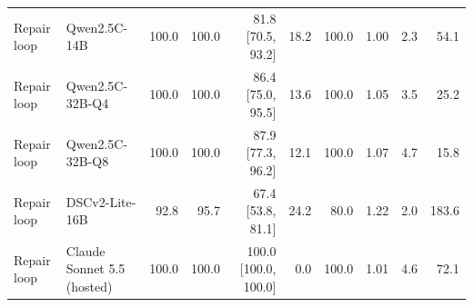 \begin{table}[t]
\begin{tabular}{llrrrrrrrr}
Repair loop & Qwen2.5C-14B & 100.0 & 100.0 & 81.8 [70.5, 93.2] & 18.2 & 100.0 & 1.00 & 2.3 & 54.1 \\
Repair loop & Qwen2.5C-32B-Q4 & 100.0 & 100.0 & 86.4 [75.0, 95.5] & 13.6 & 100.0 & 1.05 & 3.5 & 25.2 \\
Repair loop & Qwen2.5C-32B-Q8 & 100.0 & 100.0 & 87.9 [77.3, 96.2] & 12.1 & 100.0 & 1.07 & 4.7 & 15.8 \\
Repair loop & DSCv2-Lite-16B & 92.8 & 95.7 & 67.4 [53.8, 81.1] & 24.2 & 80.0 & 1.22 & 2.0 & 183.6 \\
Repair loop & Claude Sonnet 5.5 (hosted) & 100.0 & 100.0 & 100.0 [100.0, 100.0] & 0.0 & 100.0 & 1.01 & 4.6 & 72.1 \\
\bottomrule
\end{tabular}
\end{table}
